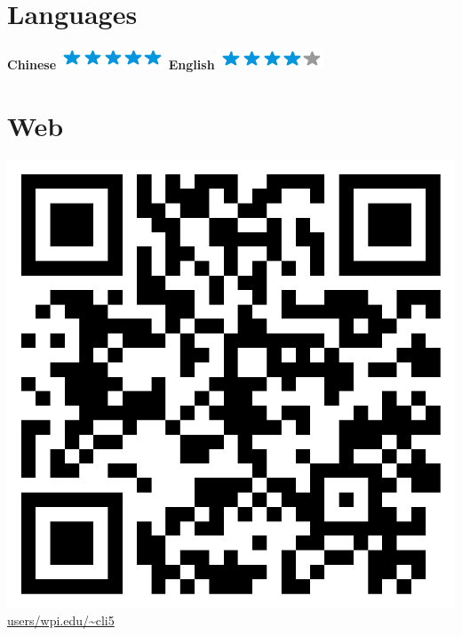 \documentclass[]{friggeri-cv}
\begin{document}
\begin{aside}
	\section{Languages}
	\textbf{Chinese}\includegraphics[scale=0.40]{img/5stars.png}
	\textbf{English}\includegraphics[scale=0.40]{img/4stars.png}
	~
	\section{Web}
	\includegraphics[scale=0.05]{img/Chao_Li.png}
	\href{http://users.wpi.edu/~cli5}{users/wpi.edu/\textasciitilde cli5}
\end{aside}
\end{document}
